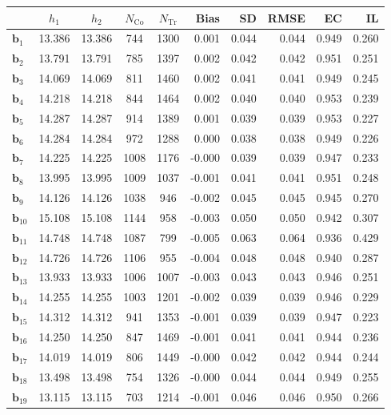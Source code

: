 \documentclass[10pt]{article}
\newcommand{\bb}{\mathbf{b}}
\begin{document}
\begin{table}[p]
    \centering
\begin{tabular}{lccccrrrrr}
\toprule\toprule
 & $h_1$ & $h_2$ & $N_{\mathrm{Co}}$ & $N_{\mathrm{Tr}}$ & Bias & SD & RMSE & EC & IL \\
\midrule
$\bb_{1}$ & 13.386 & 13.386 & 744 & 1300 & 0.001 & 0.044 & 0.044 & 0.949 & 0.260 \\
$\bb_{2}$ & 13.791 & 13.791 & 785 & 1397 & 0.002 & 0.042 & 0.042 & 0.951 & 0.251 \\
$\bb_{3}$ & 14.069 & 14.069 & 811 & 1460 & 0.002 & 0.041 & 0.041 & 0.949 & 0.245 \\
$\bb_{4}$ & 14.218 & 14.218 & 844 & 1464 & 0.002 & 0.040 & 0.040 & 0.953 & 0.239 \\
$\bb_{5}$ & 14.287 & 14.287 & 914 & 1389 & 0.001 & 0.039 & 0.039 & 0.953 & 0.227 \\
$\bb_{6}$ & 14.284 & 14.284 & 972 & 1288 & 0.000 & 0.038 & 0.038 & 0.949 & 0.226 \\
$\bb_{7}$ & 14.225 & 14.225 & 1008 & 1176 & -0.000 & 0.039 & 0.039 & 0.947 & 0.233 \\
$\bb_{8}$ & 13.995 & 13.995 & 1009 & 1037 & -0.001 & 0.041 & 0.041 & 0.951 & 0.248 \\
$\bb_{9}$ & 14.126 & 14.126 & 1038 & 946 & -0.002 & 0.045 & 0.045 & 0.945 & 0.270 \\
$\bb_{10}$ & 15.108 & 15.108 & 1144 & 958 & -0.003 & 0.050 & 0.050 & 0.942 & 0.307 \\
$\bb_{11}$ & 14.748 & 14.748 & 1087 & 799 & -0.005 & 0.063 & 0.064 & 0.936 & 0.429 \\
$\bb_{12}$ & 14.726 & 14.726 & 1106 & 955 & -0.004 & 0.048 & 0.048 & 0.940 & 0.287 \\
$\bb_{13}$ & 13.933 & 13.933 & 1006 & 1007 & -0.003 & 0.043 & 0.043 & 0.946 & 0.251 \\
$\bb_{14}$ & 14.255 & 14.255 & 1003 & 1201 & -0.002 & 0.039 & 0.039 & 0.946 & 0.229 \\
$\bb_{15}$ & 14.312 & 14.312 & 941 & 1353 & -0.001 & 0.039 & 0.039 & 0.947 & 0.223 \\
$\bb_{16}$ & 14.250 & 14.250 & 847 & 1469 & -0.001 & 0.041 & 0.041 & 0.944 & 0.236 \\
$\bb_{17}$ & 14.019 & 14.019 & 806 & 1449 & -0.000 & 0.042 & 0.042 & 0.944 & 0.244 \\
$\bb_{18}$ & 13.498 & 13.498 & 754 & 1326 & -0.000 & 0.044 & 0.044 & 0.949 & 0.255 \\
$\bb_{19}$ & 13.115 & 13.115 & 703 & 1214 & -0.001 & 0.046 & 0.046 & 0.950 & 0.266 \\

\end{tabular}
\end{table}
\end{document}
